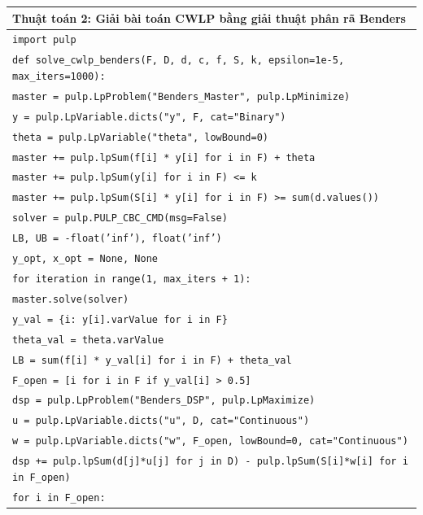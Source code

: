 \begin{table}[H]
\centering
\footnotesize
\begin{tabular}{p{15cm}}
\hline
\textbf{Thuật toán 2:} Giải bài toán CWLP bằng giải thuật phân rã Benders \\
\hline
\texttt{import pulp} \\
\texttt{def solve\_cwlp\_benders(F, D, d, c, f, S, k, epsilon=1e-5, max\_iters=1000):} \\
\texttt{\quad master = pulp.LpProblem("Benders\_Master", pulp.LpMinimize)} \\
\texttt{\quad y = pulp.LpVariable.dicts("y", F, cat="Binary")} \\
\texttt{\quad theta = pulp.LpVariable("theta", lowBound=0)} \\
\texttt{\quad master += pulp.lpSum(f[i] * y[i] for i in F) + theta} \\
\texttt{\quad master += pulp.lpSum(y[i] for i in F) <= k} \\
\texttt{\quad master += pulp.lpSum(S[i] * y[i] for i in F) >= sum(d.values())} \\
\texttt{\quad solver = pulp.PULP\_CBC\_CMD(msg=False)} \\
\texttt{\quad LB, UB = -float('inf'), float('inf')} \\
\texttt{\quad y\_opt, x\_opt = None, None} \\
\texttt{\quad for iteration in range(1, max\_iters + 1):} \\
\texttt{\quad \quad master.solve(solver)} \\
\texttt{\quad \quad y\_val = \{i: y[i].varValue for i in F\}} \\
\texttt{\quad \quad theta\_val = theta.varValue} \\
\texttt{\quad \quad LB = sum(f[i] * y\_val[i] for i in F) + theta\_val} \\
\texttt{\quad \quad F\_open = [i for i in F if y\_val[i] \textgreater\ 0.5]} \\
\texttt{\quad \quad dsp = pulp.LpProblem("Benders\_DSP", pulp.LpMaximize)} \\
\texttt{\quad \quad u = pulp.LpVariable.dicts("u", D, cat="Continuous")} \\
\texttt{\quad \quad w = pulp.LpVariable.dicts("w", F\_open, lowBound=0, cat="Continuous")} \\
\texttt{\quad \quad dsp += pulp.lpSum(d[j]*u[j] for j in D) - pulp.lpSum(S[i]*w[i] for i in F\_open)} \\
\texttt{\quad \quad for i in F\_open:} \\

\end{tabular}
\end{table}
